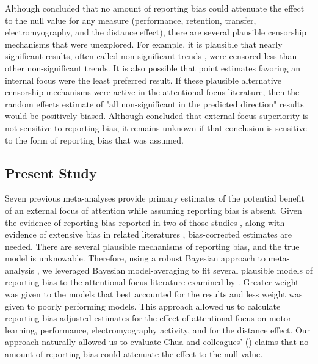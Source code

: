 \documentclass[man,floatsintext,letterpaper,12pt]{apa7}
\begin{document}
Although \textcite{chua2021} concluded that no amount of reporting bias could attenuate the effect to the null value for any measure (performance, retention, transfer, electromyography, and the distance effect), there are several plausible censorship mechanisms that were unexplored. For example, it is plausible that nearly significant results, often called non-significant trends \autocite{otte2022}, were censored less than other non-significant trends. It is also possible that point estimates favoring an internal focus were the least preferred result. If these plausible alternative censorship mechanisms were active in the attentional focus literature, then the random effects estimate of "all non-significant in the predicted direction" results would be positively biased. Although \textcite{chua2021} concluded that external focus superiority is not sensitive to reporting bias, it remains unknown if that conclusion is sensitive to the form of reporting bias that was assumed.

\subsection{Present Study}

Seven previous meta-analyses provide primary estimates of the potential benefit of an external focus of attention while assuming reporting bias is absent. Given the evidence of reporting bias reported in two of those studies \autocite{chua2021,kim2017}, along with evidence of extensive bias in related literatures \autocite[e.g.,][]{lohse2016,mckay2023}, bias-corrected estimates are needed. There are several plausible mechanisms of reporting bias, and the true model is unknowable. Therefore, using a robust Bayesian approach to meta-analysis \autocite{bartos2023}, we leveraged Bayesian model-averaging to fit several plausible models of reporting bias to the attentional focus literature examined by \textcite{chua2021}. Greater weight was given to the models that best accounted for the results and less weight was given to poorly performing models. This approach allowed us to calculate reporting-bias-adjusted estimates for the effect of attentional focus on motor learning, performance, electromyography activity, and for the distance effect. Our approach naturally allowed us to evaluate Chua and colleagues' (\citeyear{chua2021}) claims that no amount of reporting bias could attenuate the effect to the null value.
\end{document}
